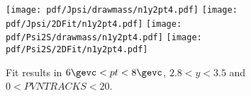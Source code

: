 \begin{figure}[H]
\begin{center}
\texttt{[image: pdf/Jpsi/drawmass/n1y2pt4.pdf]}
\texttt{[image: pdf/Jpsi/2DFit/n1y2pt4.pdf]}
\vspace*{-0.5cm}
\texttt{[image: pdf/Psi2S/drawmass/n1y2pt4.pdf]}
\texttt{[image: pdf/Psi2S/2DFit/n1y2pt4.pdf]}
\vspace*{-0.5cm}
\end{center}
\caption{Fit results in $6\gevc<pt<8\gevc$, $2.8<y<3.5$ and $0<PVNTRACKS<20$.}
\label{Fitn1y2pt4}
\end{figure}
